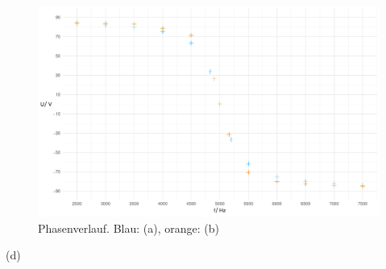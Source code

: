 \documentclass[a4paper, 12pt]{article}
\begin{document}
        \begin{figure}[H]
          \begin{center}
          \includegraphics[scale=0.3819660112501051]{./R/3_2/3_2_phase.pdf}
          \caption*{Phasenverlauf. Blau: (a), orange: (b)}
          \end{center}
        \end{figure}

      \noindent (d)\\

  \subsection{}

  \subsection{}

  \subsection{}
\end{document}
